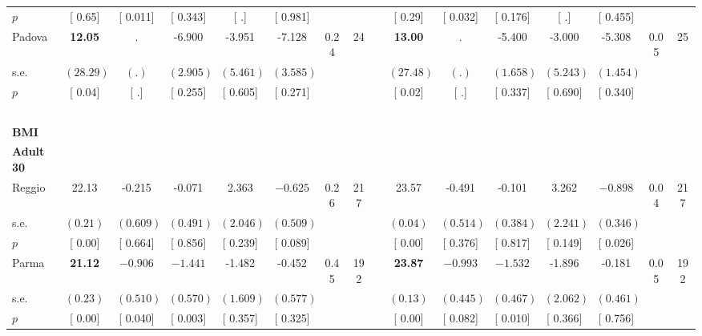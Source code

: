 \begin{longtable}{L{8em} c c c c c c c p{1em} c c c c c c c}
\quad \quad \quad \quad $ p$ & [     0.65] & [    0.011] & [    0.343] & [        .] & [    0.981] & & & & [     0.29] & [    0.032] & [    0.176] & [        .] & [    0.455] & &  \\[1em]
\quad \quad \quad Padova& \textbf{    12.05} &         . &    -6.900 &    -3.951 &    -7.128 &      0.24 &        24 & & \textbf{    13.00} &         . &    -5.400 &    -3.000 &    -5.308 &      0.05 &        25  \\*
\quad \quad \quad \quad s.e.& $ (    28.29)$ & $ (        .)$ & $ (    2.905)$ & $ (    5.461)$ & $ (    3.585)$ & & & & $ (    27.48)$ & $ (        .)$ & $ (    1.658)$ & $ (    5.243)$ & $ (    1.454)$ & &  \\*
\quad \quad \quad \quad $ p$ & [     0.04] & [        .] & [    0.255] & [    0.605] & [    0.271] & & & & [     0.02] & [        .] & [    0.337] & [    0.690] & [    0.340] & &  \\[1em]
~\\[1em]
\textbf{BMI} \\*
\quad \quad \textbf{Adult 30} & & & & & & & & & & & & & & & \\* 
\quad \quad \quad Reggio& 22.13 &    -0.215 &    -0.071 &     2.363 & $ \mathbf{   -0.625}$ &      0.26 &       217 & & 23.57 &    -0.491 &    -0.101 &     3.262 & $ \mathbf{   -0.898}$ &      0.04 &       217  \\*
\quad \quad \quad \quad s.e.& $ (     0.21)$ & $ (    0.609)$ & $ (    0.491)$ & $ (    2.046)$ & $ (    0.509)$ & & & & $ (     0.04)$ & $ (    0.514)$ & $ (    0.384)$ & $ (    2.241)$ & $ (    0.346)$ & &  \\*
\quad \quad \quad \quad $ p$ & [     0.00] & [    0.664] & [    0.856] & [    0.239] & [    0.089] & & & & [     0.00] & [    0.376] & [    0.817] & [    0.149] & [    0.026] & &  \\[1em]
\quad \quad \quad Parma& \textbf{    21.12} & $ \mathbf{   -0.906}$ & $ \mathbf{   -1.441}$ &    -1.482 &    -0.452 &      0.45 &       192 & & \textbf{    23.87} & $ \mathbf{   -0.993}$ & $ \mathbf{   -1.532}$ &    -1.896 &    -0.181 &      0.05 &       192  \\*
\quad \quad \quad \quad s.e.& $ (     0.23)$ & $ (    0.510)$ & $ (    0.570)$ & $ (    1.609)$ & $ (    0.577)$ & & & & $ (     0.13)$ & $ (    0.445)$ & $ (    0.467)$ & $ (    2.062)$ & $ (    0.461)$ & &  \\*
\quad \quad \quad \quad $ p$ & [     0.00] & [    0.040] & [    0.003] & [    0.357] & [    0.325] & & & & [     0.00] & [    0.082] & [    0.010] & [    0.366] & [    0.756] & &  \\[1em]

\end{longtable}
